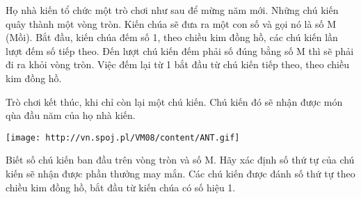 Họ nhà kiến tổ chức một trò chơi như sau để mừng năm mới. Những chú kiến quây thành một vòng tròn. Kiến chúa sẽ   đưa ra một con số và gọi nó là số M (Mồi). Bắt đầu, kiến chúa đếm số 1, theo chiều kim đồng hồ, các chú kiến lần lượt   đếm số tiếp theo. Đến lượt chú kiến đếm phải số đúng bằng số M thì sẽ phải đi ra khỏi vòng tròn. Việc đếm lại từ 1 bắt đầu   từ chú kiến tiếp theo, theo chiều kim đồng hồ.  

   Trò chơi kết thúc, khi chỉ còn lại một chú kiến. Chú kiến đó sẽ nhận được món qùa đầu năm của họ nhà kiến.  


\texttt{[image: http://vn.spoj.pl/VM08/content/ANT.gif]}

   Biết số chú kiến ban đầu trên vòng tròn và số M. Hãy xác định số thứ tự của chú kiến sẽ nhận được phần thưởng may   mắn. Các chú kiến được đánh số thứ tự theo chiều kim đồng hồ, bắt đầu từ kiến chúa có số hiệu 1.